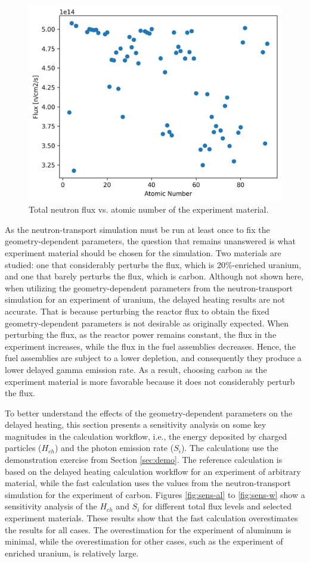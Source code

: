 \begin{figure}[htbp!]
  \begin{center}
    \includegraphics[width=0.60\linewidth]{figures/demo-materials-flux}
  \end{center}
  \caption{Total neutron flux vs. atomic number of the experiment material.}
  \label{fig:atr-flux}
\end{figure}

As the neutron-transport simulation must be run at least once to fix the geometry-dependent parameters, the question that remains unanswered is what experiment material should be chosen for the simulation.
Two materials are studied: one that considerably perturbs the flux, which is 20\%-enriched uranium, and one that barely perturbs the flux, which is carbon.
Although not shown here, when utilizing the geometry-dependent parameters from the neutron-transport simulation for an experiment of uranium, the delayed heating results are not accurate.
That is because perturbing the reactor flux to obtain the fixed geometry-dependent parameters is not desirable as originally expected.
When perturbing the flux, as the reactor power remains constant, the flux in the experiment increases, while the flux in the fuel assemblies decreases.
Hence, the fuel assemblies are subject to a lower depletion, and consequently they produce a lower delayed gamma emission rate.
As a result, choosing carbon as the experiment material is more favorable because it does not considerably perturb the flux.

To better understand the effects of the geometry-dependent parameters on the delayed heating, this section presents a sensitivity analysis on some key magnitudes in the calculation workflow, i.e., the energy deposited by charged particles ($H_{ch}$) and the photon emission rate ($S_i$).
The calculations use the demonstration exercise from Section \ref{sec:demo}.
The reference calculation is based on the delayed heating calculation workflow for an  experiment of arbitrary material, while the fast calculation uses the values from the neutron-transport simulation for the experiment of carbon.
Figures \ref{fig:sens-al} to \ref{fig:sens-w} show a sensitivity analysis of the $H_{ch}$ and $S_i$ for different total flux levels and selected experiment materials.
These results show that the fast calculation overestimates the results for all cases.
The overestimation for the experiment of aluminum is minimal, while the overestimation for other cases, such as the experiment of enriched uranium, is relatively large.

